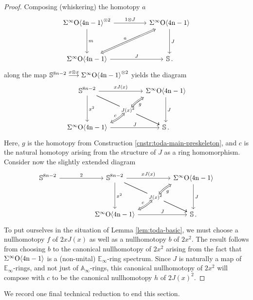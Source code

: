 \begin{proof}
Composing (whiskering) the homotopy $a$
$$
\begin{tikzcd}[column sep = huge]
\sOf^{\otimes 2} \arrow{dd}{m} \arrow{r}{1 \otimes J} & \sOf \arrow{dd}{J} \\ \\
\sOf \arrow{r}{J} \arrow[Leftrightarrow]{ruu}{a} & \bS.
\end{tikzcd}
$$
along the map $\mathbb{S}^{8n-2} \stackrel{x \otimes x}{\longrightarrow} \Sigma^{\infty} \mathrm{O \langle 4n-1\rangle}^{\otimes 2}$ yields the diagram
$$
\begin{tikzcd}[column sep = huge]
\bS^{8n-2} \arrow{dd}{x^2} \arrow{r}{xJ(x)} \arrow[rdd,""{name=MU},"J(x)^2" description] \arrow[rdd,swap, ""{name=MD},"J(x)^2" description] &
\sOf \arrow{dd}{J} \arrow[bend left=10,Leftrightarrow, from=MU, swap, "g"] \\ \\
\sOf \arrow{r}{J} \arrow[bend left=10,Leftrightarrow, from=MD, swap, "c"]  & \bS. 
\end{tikzcd}
$$
Here, $g$ is the homotopy from Construction \ref{cnstr:toda-main-preskeleton}, and $c$ is the natural homotopy arising from the structure of $J$ as a ring homomorphism.  Consider now the slightly extended diagram 
$$
\begin{tikzcd}[column sep = huge]
\bS^{8n-2} \arrow{r}{2} &\bS^{8n-2} \arrow{dd}{x^2} \arrow{r}{xJ(x)} \arrow[rdd,""{name=MU},"J(x)^2" description] \arrow[rdd,swap, ""{name=MD},"J(x)^2" description] &
\sOf \arrow{dd}{J} \arrow[bend left=10,Leftrightarrow, from=MU, swap, "g"] \\ \\
&\sOf \arrow{r}{J} \arrow[bend left=10,Leftrightarrow, from=MD, swap, "c"]  & \bS. 
\end{tikzcd}
$$
To put ourselves in the situation of Lemma \ref{lem:toda-basic}, we must choose a nullhomotopy $f$ of $2xJ(x)$ as well as a nullhomotopy $b$ of $2x^2$.  The result follows from choosing $b$ to the canonical nullhomotopy of $2x^2$ arising from the fact that $\Sigma^{\infty} \mathrm{O \langle 4n-1\rangle}$ is a (non-unital) $\mathbb{E}_\infty$-ring spectrum.  Since $J$ is naturally a map of $\mathbb{E}_\infty$-rings, and not just of $\mathbb{A}_\infty$-rings, this canonical nullhomotopy of $2x^2$ will compose with $c$ to be the canonical nullhomotopy $h$ of $2J(x)^2$.
\end{proof}

We record one final technical reduction to end this section.

